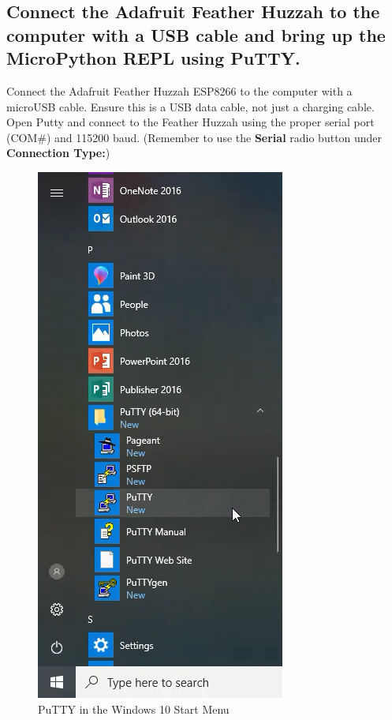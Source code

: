 \documentclass{book}
\makeatletter
\def\maxwidth{\ifdim\Gin@nat@width>\linewidth\linewidth
    \else\Gin@nat@width\fi}
\let\Oldincludegraphics\includegraphics
\renewcommand{\includegraphics}[1]{\Oldincludegraphics[width=.8\maxwidth]{#1}}
\makeatother
\begin{document}
    \subsection{Connect the Adafruit Feather Huzzah to the computer with a
USB cable and bring up the MicroPython REPL using
PuTTY.}\label{connect-the-adafruit-feather-huzzah-to-the-computer-with-a-usb-cable-and-bring-up-the-micropython-repl-using-putty.}

    Connect the Adafruit Feather Huzzah ESP8266 to the computer with a
microUSB cable. Ensure this is a USB data cable, not just a charging
cable. Open Putty and connect to the Feather Huzzah using the proper
serial port (COM\#) and 115200 baud. (Remember to use the
\textbf{Serial} radio button under \textbf{Connection Type:})

\begin{figure}
\centering
\includegraphics{images/putty_in_start_menu.png}
\caption{PuTTY in the Windows 10 Start Menu}
\end{figure}
\end{document}
